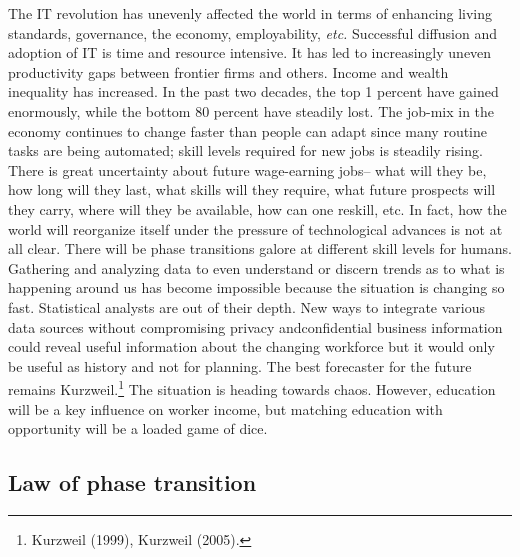 \begin{multicols}{2}
The IT revolution has unevenly affected the world in terms of enhancing living standards, governance, the economy, employability, \textit{etc.} Successful diffusion and adoption of IT is time and resource intensive. It has led to increasingly uneven productivity gaps between frontier firms and others. Income and wealth inequality has increased. In the past two decades, the top 1 percent have gained enormously, while the bottom 80 percent have steadily lost. The job-mix in the economy continues to change faster than people can adapt since many routine tasks are being automated; skill levels required for new jobs is steadily rising. There is great uncertainty about future wage-earning jobs-- what will they be, how long will they last, what skills will they require, what future prospects will they carry, where will they be available, how can one reskill, etc. In fact, how the world will reorganize itself under the pressure of technological advances is not at all clear. There will be phase transitions galore at different skill levels for humans. Gathering and analyzing data to even understand or discern trends as to what is happening around us has become impossible because the situation is changing so fast. Statistical analysts are out of their depth. New ways to integrate various data sources without compromising privacy and\break confidential business information could reveal useful information about the changing workforce but it would only be useful as history and not for planning. The best forecaster for the future remains Kurzweil.\footnote{Kurzweil (1999), Kurzweil (2005).} The situation is heading towards chaos. However, education will be a key influence on worker income, but matching education with opportunity will be a loaded game of dice.

\subsection*{Law of phase transition}


\end{multicols}

